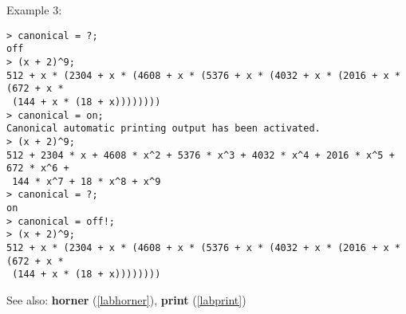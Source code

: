 \noindent Example 3: 
\begin{center}\begin{minipage}{15cm}\begin{Verbatim}[frame=single]
> canonical = ?;
off
> (x + 2)^9;
512 + x * (2304 + x * (4608 + x * (5376 + x * (4032 + x * (2016 + x * (672 + x *
 (144 + x * (18 + x))))))))
> canonical = on;
Canonical automatic printing output has been activated.
> (x + 2)^9;
512 + 2304 * x + 4608 * x^2 + 5376 * x^3 + 4032 * x^4 + 2016 * x^5 + 672 * x^6 +
 144 * x^7 + 18 * x^8 + x^9
> canonical = ?;
on
> canonical = off!;
> (x + 2)^9;
512 + x * (2304 + x * (4608 + x * (5376 + x * (4032 + x * (2016 + x * (672 + x *
 (144 + x * (18 + x))))))))
\end{Verbatim}
\end{minipage}\end{center}
See also: \textbf{horner} (\ref{labhorner}), \textbf{print} (\ref{labprint})
